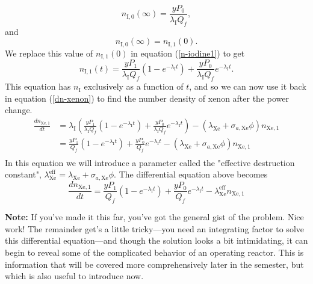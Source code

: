 \documentclass{report}
\begin{document}
$$ n_{\text{I},0}(\infty) = \frac{y P_0}{\lambda_{\text{I}}Q_f} ,$$
and
$$ n_{\text{I},0}(\infty) = n_{\text{I},1}(0) .$$
We replace this value of $n_{\text{I},1}(0)$ in equation (\ref{n-iodine1}) to get
\begin{equation}
\label{n-iodine1-comp}
n_{\text{I},1}(t) = \frac{y P_1}{\lambda_{\text{I}}Q_f}\left(1-e^{-\lambda_{\text{I}}t}\right) + \frac{y P_0}{\lambda_{\text{I}}Q_f}e^{-\lambda_{\text{I}}t}.
\end{equation}
This equation has $n_{\text{I}}$ exclusively as a function of $t$, and so we can now use it back in equation (\ref{dn-xenon}) to find the number density of xenon after the power change. 
\begin{align*}
\frac{dn_{\text{Xe},1}}{dt}	&= \lambda_{\text{I}}\left(\frac{y P_1}{\lambda_{\text{I}}Q_f}\left(1-e^{-\lambda_{\text{I}}t}\right) + \frac{y P_0}{\lambda_{\text{I}}Q_f}e^{-\lambda_{\text{I}}t}\right) - (\lambda_{\text{Xe}} + \sigma_{a,\text{Xe}}\phi) n_{\text{Xe},1} \\
							&= \frac{y P_1}{Q_f}\left(1-e^{-\lambda_{\text{I}}t}\right) + \frac{y P_0}{Q_f}e^{-\lambda_{\text{I}}t} - (\lambda_{\text{Xe}} + \sigma_{a,\text{Xe}}\phi) n_{\text{Xe},1}\\
\end{align*}
In this equation we will introduce a parameter called the "effective destruction constant", $\lambda_{\text{Xe}}^{\text{eff}} = \lambda_{\text{Xe}} + \sigma_{a,\text{Xe}} \phi. $ The differential equation above becomes
$$ \frac{dn_{\text{Xe},1}}{dt} = \frac{y P_1}{Q_f}\left(1-e^{-\lambda_{\text{I}}t}\right) + \frac{y P_0}{Q_f}e^{-\lambda_{\text{I}}t} - \lambda_{\text{Xe}}^{\text{eff}} n_{\text{Xe},1} $$

\textbf{Note:} If you've made it this far, you've got the general gist of the problem. Nice work! The remainder get's a little tricky---you need an integrating factor to solve this differential equation---and though the solution looks a bit intimidating, it can begin to reveal some of the complicated behavior of an operating reactor. This is information that will be covered more comprehensively later in the semester, but which is also useful to introduce now. 
\end{document}
